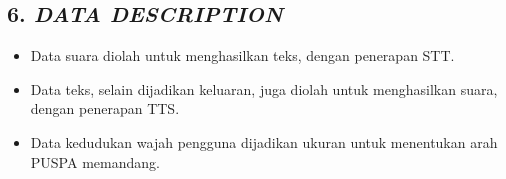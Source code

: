 \subsection*{\textcolor{subsectioncolor}{\textsf{6. \textit{DATA DESCRIPTION}}}}


\begin{itemize}
\item Data suara diolah untuk menghasilkan teks, dengan penerapan STT.
\item Data teks, selain dijadikan keluaran, juga diolah untuk menghasilkan suara, dengan penerapan TTS.
\item Data kedudukan wajah pengguna dijadikan ukuran untuk menentukan arah PUSPA memandang.
\end{itemize}
